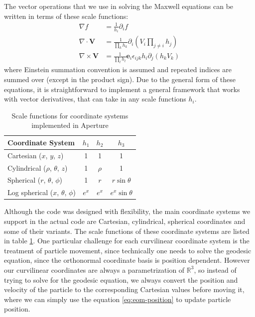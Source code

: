 The vector operations that we use in solving the Maxwell equations can be
written in terms of these scale functions:
\begin{align}
  \label{eq:vector-derivatives}
  \nabla f &= \frac{1}{h_{i}}\partial_{i}f \\
  \nabla \cdot \mathbf{V} &= \frac{1}{\prod_{k}h_{k}}\partial_i(V_i\prod_{j\neq i}h_{j}) \\
  \nabla \times \mathbf{V} &= \frac{1}{\prod_lh_l}\mathbf{e}_{i}\epsilon_{ijk}h_i\partial_j(h_kV_k)
\end{align}
where Einstein summation convention is assumed and repeated indices are summed
over (except in the product sign). Due to the general form of these equations,
it is straightforward to implement a general framework that works with vector
derivatives, that can take in any scale functions $h_{i}$.

\begin{table}[h]
  \centering
  \begin{tabular}{lccc}
    \hline
    Coordinate System & $h_1$ & $h_2$ & $h_3$ \\ \hline
    Cartesian ($x$, $y$, $z$) & 1 & 1 & 1 \\ \hline
    Cylindrical ($\rho$, $\theta$, $z$) & 1 & $\rho$ & 1 \\ \hline
    Spherical ($r$, $\theta$, $\phi$) & 1 & $r$ & $r\sin\theta$ \\ \hline
    Log spherical ($x$, $\theta$, $\phi$) & $e^x$ & $e^{x}$ & $e^x\sin\theta$ \\ \hline
  \end{tabular}
  \caption{Scale functions for coordinate systems implemented in Aperture}
  \label{tab:scale-functions}
\end{table}

Although the code was designed with flexibility, the main coordinate systems we
support in the actual code are Cartesian, cylindrical, spherical coordinates and
some of their variants. The scale functions of these coordinate systems are
listed in table \ref{tab:scale-functions}. One particular challenge for each
curvilinear coordinate system is the treatment of particle movement, since
technically one needs to solve the geodesic equation, since the orthonormal
coordinate basis is position dependent. However our curvilinear coordinates are
always a parametrization of $\mathbb{R}^{3}$, so instead of trying to solve for
the geodesic equation, we always convert the position and velocity of the
particle to the corresponding Cartesian values before moving it, where we can
simply use the equation \eqref{eq:eom-position} to update particle position.


